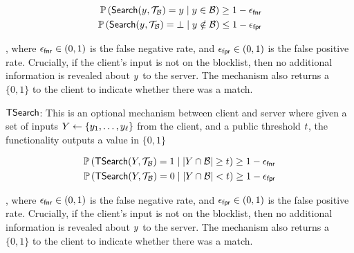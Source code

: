 \begin{align}
\cprob{}{\searchBlocklist(\genericCInputElmt, \blklistToken) = \genericCInputElmt}{\genericCInputElmt \in \blocklist} \ge 1 - \fnr\\
\cprob{}{\searchBlocklist(\genericCInputElmt, \blklistToken) = \bot}{\genericCInputElmt \notin \blocklist} \le 1 - \fpr 
\end{align}

, where $\epsilon_\mathsf{fnr} \in (0,1)$ is the false negative rate, and $\epsilon_\mathsf{fpr} \in (0,1)$ is the false positive rate. Crucially, if the client's input is not on the blocklist, then no additional information is revealed about $\genericCInputElmt$ to the server. The mechanism also returns a $\{0, 1\}$ to the client to indicate whether there was a match.  


\item $\mathsf{TSearch}$: This is an optional mechanism between client and server where given a set of inputs $\genericCInputSet \assign \{ \genericCInputElmt{1}, \dots, \genericCInputElmt{\genericVecLen} \}$ from the client, and a public threshold $t$, the functionality outputs a value in $\{0,1\}$ 

\begin{align*}
\cprob{}{\thresholdSearchBlocklist(\genericCInputSet, \blklistToken) = 1}{|\genericCInputSet \cap \blocklist| \ge \threshold} \ge  1 - \fnr\\
\cprob{}{\thresholdSearchBlocklist(\genericCInputSet, \blklistToken) = 0}{|\genericCInputSet \cap \blocklist| < \threshold} \ge  1 - \fpr\\
\end{align*}


, where $\epsilon_\mathsf{fnr} \in (0,1)$ is the false negative rate, and $\epsilon_\mathsf{fpr} \in (0,1)$ is the false positive rate. Crucially, if the client's input is not on the blocklist, then no additional information is revealed about $\genericCInputElmt$ to the server. The mechanism also returns a $\{0, 1\}$ to the client to indicate whether there was a match. 

\itemListEnd


